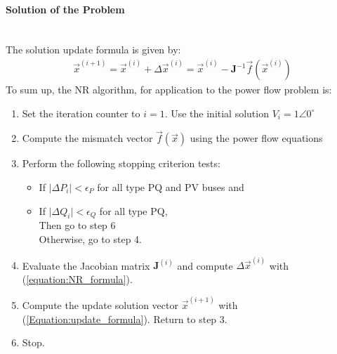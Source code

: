 \paragraph{Solution of the Problem} \mbox{}\\

\noindent The solution update formula is given by:
\begin{align}
	\vec{x}^{(i+1)} = \vec{x}^{(i)} + \Delta \vec{x}^{(i)} = \vec{x}^{(i)} - \textbf{J}^{-1} \vec{f} (\vec{x}^{(i)})
	\label{Equation:update_formula}
\end{align}
To sum up, the NR algorithm, for application to the power flow problem is:
\begin{enumerate}
	\item Set the iteration counter to $i=1$. Use the initial solution $V_{i} = 1 \angle 0^{\circ}$
	\item Compute the mismatch vector $\vec{f}({\vec{x}})$ using the power flow equations
	\item Perform the following stopping criterion tests:
		\begin{itemize}
			\item If $\vert \Delta P_{i} \vert < \epsilon_{P}$ for all type PQ and PV buses and
			\item If $\vert \Delta Q_{i} \vert < \epsilon_{Q}$ for all type PQ, \\
			Then go to step 6 \\
			Otherwise, go to step 4.
		\end{itemize}
	\item Evaluate the Jacobian matrix $\textbf{J}^{(i)}$ and compute $\Delta \vec{x}^{(i)}$ with (\ref{equation:NR_formula}).
	\item Compute the update solution vector $\vec{x}^{(i+1)}$ with (\ref{Equation:update_formula}). Return to step 3.
	\item Stop.
\end{enumerate}